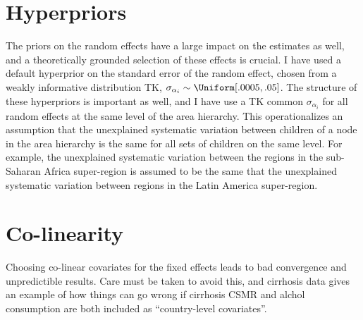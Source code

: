 \section{Hyperpriors}
The priors on the random effects have a large impact on the estimates
as well, and a theoretically grounded selection of these effects is
crucial.  I have used a default hyperprior on the standard error of the random
effect, chosen from a weakly informative distribution TK, $\sigma_{\alpha_i}
\sim \Uniform[.0005, .05]$.  The structure of these hyperpriors is
important as well, and I have use a TK common $\sigma_{\alpha_i}$ for all
random effects at the same level of the area hierarchy.  This
operationalizes an assumption that the unexplained systematic variation between
children of a node in the area hierarchy is the same for all sets of
children on the same level.  For example, the unexplained systematic
variation between the regions in the sub-Saharan Africa super-region
is assumed to be the same that the unexplained systematic variation
between regions in the Latin America super-region.

\section{Co-linearity}
Choosing co-linear covariates for the fixed effects leads to bad
convergence and unpredictible results.  Care must be taken to avoid
this, and cirrhosis data gives an example of how things can go wrong
if cirrhosis CSMR and alchol consumption are both included as
``country-level covariates''.
